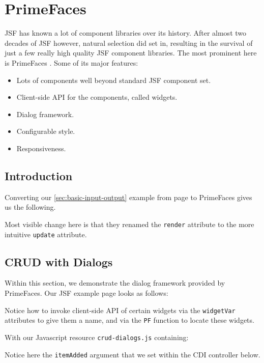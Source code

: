 %

\chapter{PrimeFaces}

JSF has known a lot of component libraries over its history.
After almost two decades of JSF however, natural selection did set in,
resulting in the survival of just a few really high quality JSF component libraries.
The most prominent here is PrimeFaces \cite{PrimeFaces}.
Some of its major features:
\begin{itemize}
	\item Lots of components well beyond standard JSF component set.
	\item Client-side API for the components, called widgets.
	\item Dialog framework.
	\item Configurable style.
	\item Responsiveness.
\end{itemize}

\section{Introduction}
Converting our \ref{sec:basic-input-output}  example from page \pageref{sec:basic-input-output} to PrimeFaces gives us the following.

Most visible change here is that they renamed the \texttt{render} attribute to the more intuitive \texttt{update} attribute.

\section{CRUD with Dialogs}
Within this section, we demonstrate the dialog framework provided by PrimeFaces.
Our JSF example page looks as follows:

Notice how to invoke client-side API of certain widgets via the \texttt{widgetVar} attributes to give them a name, and via the \texttt{PF} function to locate these widgets.

With our Javascript resource \texttt{crud-dialogs.js} containing:

Notice here the \texttt{itemAdded} argument that we set within the CDI controller below.

